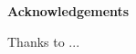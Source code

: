 \newpage
\thispagestyle{empty}
\begin{center}
    {\large \bf Acknowledgements}
\end{center}

\par
\noindent
    Thanks to ...
